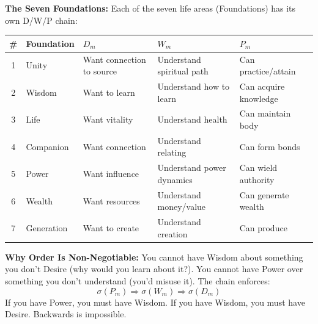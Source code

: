 \documentclass[11pt,twoside]{book}
\begin{document}
\begin{tcolorbox}[colback=green!5!white,colframe=green!65!black,title=\textbf{Plain English: What is a D/W/P Chain?},breakable]
\textbf{The Seven Foundations:}
Each of the seven life areas (Foundations) has its own D/W/P chain:
\begin{center}
\footnotesize
\begin{tabularx}{\textwidth}{c|l|X|X|X}
\toprule
\textbf{\#} & \textbf{Foundation} & \textbf{$D_m$} & \textbf{$W_m$} & \textbf{$P_m$} \\
\midrule
1 & Unity & Want connection to source & Understand spiritual path & Can practice/attain \\
2 & Wisdom & Want to learn & Understand how to learn & Can acquire knowledge \\
3 & Life & Want vitality & Understand health & Can maintain body \\
4 & Companion & Want connection & Understand relating & Can form bonds \\
5 & Power & Want influence & Understand power dynamics & Can wield authority \\
6 & Wealth & Want resources & Understand money/value & Can generate wealth \\
7 & Generation & Want to create & Understand creation & Can produce \\
\bottomrule
\end{tabularx}
\end{center}

\textbf{Why Order Is Non-Negotiable:}
You cannot have Wisdom about something you don't Desire (why would you learn about it?). You cannot have Power over something you don't understand (you'd misuse it). The chain enforces:
\[
    \sigma(P_m) \Rightarrow \sigma(W_m) \Rightarrow \sigma(D_m)
\]
If you have Power, you must have Wisdom. If you have Wisdom, you must have Desire. Backwards is impossible.

\end{tcolorbox}
\end{document}
